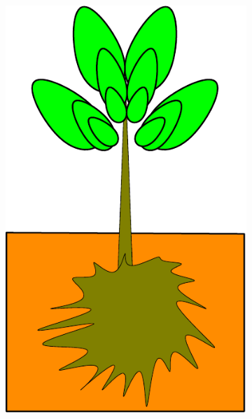 \documentclass[10pt]{article}
\begin{document}
\begin{figure}
\begin{subfigure}[b]{.1125\linewidth}
\includegraphics[width=1.0\linewidth]{img/tree_pics_4}
\caption{}  %
\label{fig:grow_4}
\end{subfigure}
\begin{subfigure}[b]{.1125\linewidth}
\centering

\end{subfigure}
\end{figure}
\end{document}
